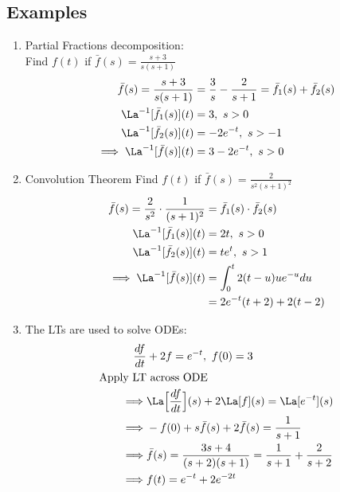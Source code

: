 \documentclass[a4paper, 11pt, normalem]{report}
\begin{document}
\subsection{Examples}
\begin{enumerate}
    \item Partial Fractions decomposition: \\
          Find $f(t)$ if $\bar{f}(s) = \frac{s + 3}{s(s + 1)}$
            \begin{align*}
                \bar{f}(s) = \frac{s + 3}{s(s + 1)} &= \frac{3}{s} - \frac{2}{s + 1} = \bar{f}_{1}(s) + \bar{f}_2 (s) \\
                \La^{-1}[\bar{f}_1 (s)](t) &= 3,~ s > 0 \\
                \La^{-1}[\bar{f}_2 (s)](t) &= -2e^{-t},~ s > -1 \\
                \implies \La^{-1}[\bar{f}(s)](t) &= 3 - 2e^{-t},~ s > 0
            \end{align*}
    \item Convolution Theorem
          Find $f(t)$ if $\bar{f}(s) = \frac{2}{s^2 (s + 1)^2}$
            \begin{align*}
                \bar{f}(s) = \frac{2}{s^2} \cdot \frac{1}{(s + 1)^2} &= \bar{f}_1 (s) \cdot \bar{f}_2 (s) \\
                \La^{-1}[\bar{f}_1 (s)](t) &= 2t,~ s > 0 \\
                \La^{-1}[\bar{f}_2 (s)](t) &= te^t, ~ s > 1 \\
                \implies \La^{-1}[\bar{f}(s)](t) &= \int_{0}^{t} 2(t - u)ue^{-u}du \\
                &= 2e^{-t}(t + 2) + 2(t - 2)
            \end{align*}
    \item The LTs are used to solve ODEs:
            \begin{align*}
                \frac{df}{dt} &+ 2f = e^{-t},~ f(0) = 3 \\
                \text{Apply LT}&\text{ across ODE} \\
                \implies& \La\Big[\frac{df}{dt}\Big](s) + 2\La[f](s) = \La[e^{-t}](s) \\
                \implies& -f(0) + s\bar{f}(s) + 2\bar{f}(s) = \frac{1}{s + 1} \\
                \implies& \bar{f}(s) = \frac{3s + 4}{(s + 2)(s + 1)} = \frac{1}{s + 1} + \frac{2}{s + 2} \\
                \implies& f(t) = e^{-t} + 2e^{-2t}
            \end{align*}

\end{enumerate}
\end{document}
